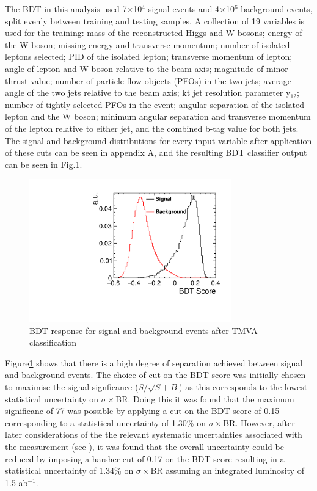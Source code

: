 The \ac{BDT} in this analysis used 7$\times$10$^4$ signal events and 4$\times$10$^6$ background events, split evenly between training and testing samples. A collection of 19 variables is used for the training: mass of the reconstructed Higgs and W bosons; energy of the W boson; missing energy and transverse momentum; number of isolated leptons selected; PID of the isolated lepton; transverse momentum of lepton; angle of lepton and W boson relative to the beam axis; magnitude of minor thrust value; number of particle flow objects (PFOs) in the two jets; average angle of the two jets relative to the beam axis; kt jet resolution parameter y$_{12}$; number of tightly selected PFOs in the event; angular separation of the isolated lepton and the W boson;  minimum angular separation and transverse momentum of the lepton relative to either jet, and the combined b-tag value for both jets. The signal and background distributions for every input variable after application of these cuts can be seen in appendix A, and the resulting BDT classifier output can be seen in Fig.\ref{bdt}.  

\begin{figure}
  \centering
  \includegraphics[width=0.78\textwidth,keepaspectratio]{HiggsAnalysis/figures/bdtscore}
  \caption[Classifier BDT response]{BDT response for signal and background events after TMVA classification}
  \label{bdt}
\end{figure}

Figure\ref{bdt} shows that there is a high degree of separation achieved between signal and background events.
The choice of cut on the BDT score was initially chosen to maximise the signal signficance ($S/\sqrt{S+B}$) as this corresponds to the lowest statistical uncertainty on $\sigma\times$BR. Doing this it was found that the maximum significanc of 77 was possible by applying a cut on the BDT score of 0.15 corresponding to a statistical uncertainty of 1.30\% on $\sigma\times$BR. However, after later considerations of the the relevant systematic uncertainties associated with the measurement (see ), it was found that the overall uncertainty could be reduced by imposing a harsher cut of 0.17 on the BDT score resulting in a statistical uncertainty of 1.34\% on $\sigma\times$BR assuming an integrated luminosity of 1.5 ab$^{-1}$.

